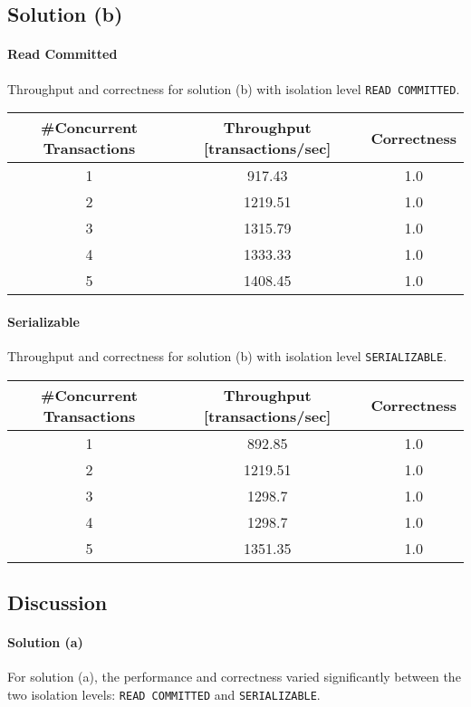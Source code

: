 \documentclass[11pt]{scrartcl}
\begin{document}
\subsection*{Solution (b)}

\paragraph{Read Committed}

Throughput and correctness for solution (b) with isolation level \lstinline[style=dbtsql]{READ COMMITTED}.

\begin{table}[H]
  \centering
  \begin{tabular}{c|c|c}
    \#Concurrent Transactions & Throughput [transactions/sec] & Correctness
      \tabularnewline
    \hline
    1 & 917.43 & 1.0 \tabularnewline
    2 & 1219.51 & 1.0 \tabularnewline
    3 & 1315.79 & 1.0 \tabularnewline
    4 & 1333.33 & 1.0 \tabularnewline
    5 & 1408.45 & 1.0 \tabularnewline
  \end{tabular}
\end{table}

\paragraph{Serializable}

Throughput and correctness for solution (b) with isolation level \lstinline[style=dbtsql]{SERIALIZABLE}.

\begin{table}[H]
  \centering
  \begin{tabular}{c|c|c}
    \#Concurrent Transactions & Throughput [transactions/sec] & Correctness
      \tabularnewline
    \hline
    1 & 892.85 & 1.0 \tabularnewline
    2 & 1219.51 & 1.0 \tabularnewline
    3 & 1298.7 & 1.0 \tabularnewline
    4 & 1298.7 & 1.0 \tabularnewline
    5 & 1351.35 & 1.0 \tabularnewline
  \end{tabular}
\end{table}

\subsection*{Discussion}

\paragraph{Solution (a)}

For solution (a), the performance and correctness varied significantly between the two isolation levels:
\lstinline[style=dbtsql]{READ COMMITTED} and \lstinline[style=dbtsql]{SERIALIZABLE}.
\end{document}
